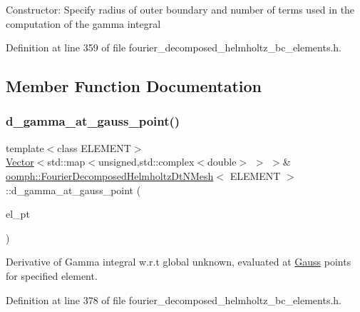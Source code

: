 Constructor\+: Specify radius of outer boundary and number of terms used in the computation of the gamma integral 

Definition at line 359 of file fourier\+\_\+decomposed\+\_\+helmholtz\+\_\+bc\+\_\+elements.\+h.



\subsection{Member Function Documentation}
\mbox{\label{classoomph_1_1FourierDecomposedHelmholtzDtNMesh_a67dab999800a4d2a797d7d146ccbcfca}} 
\subsubsection{\texorpdfstring{d\+\_\+gamma\+\_\+at\+\_\+gauss\+\_\+point()}{d\_gamma\_at\_gauss\_point()}}
{\footnotesize\ttfamily template$<$class E\+L\+E\+M\+E\+NT$>$ \\
\hyperlink{classoomph_1_1Vector}{Vector}$<$std\+::map$<$unsigned,std\+::complex$<$double$>$ $>$ $>$\& \hyperlink{classoomph_1_1FourierDecomposedHelmholtzDtNMesh}{oomph\+::\+Fourier\+Decomposed\+Helmholtz\+Dt\+N\+Mesh}$<$ E\+L\+E\+M\+E\+NT $>$\+::d\+\_\+gamma\+\_\+at\+\_\+gauss\+\_\+point (\begin{DoxyParamCaption}\item[{\hyperlink{classoomph_1_1FiniteElement}{Finite\+Element} $\ast$}]{el\+\_\+pt }\end{DoxyParamCaption})\hspace{0.3cm}{\ttfamily [inline]}}



Derivative of Gamma integral w.\+r.\+t global unknown, evaluated at \hyperlink{classoomph_1_1Gauss}{Gauss} points for specified element. 



Definition at line 378 of file fourier\+\_\+decomposed\+\_\+helmholtz\+\_\+bc\+\_\+elements.\+h.

\mbox{\label{classoomph_1_1FourierDecomposedHelmholtzDtNMesh_a1620b1c9ce32a360c6b6ad89bdaef354}} 
